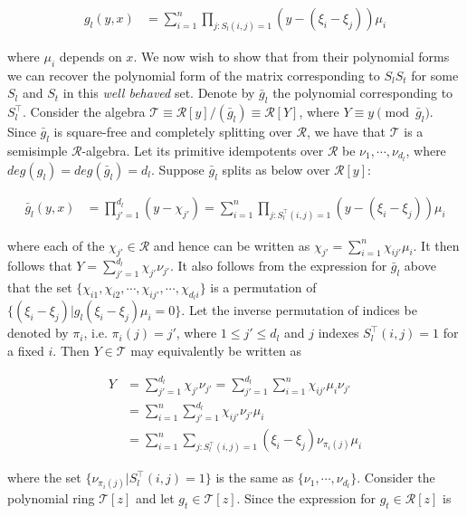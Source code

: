 	\begin{align*}
		g_l(y,x) &= \sum_{i=1}^n \prod_{j:S_l(i,j)=1} (y-(\xi_i-\xi_j)) \mu_i
	\end{align*}


        where $\mu_i$ depends on $x$. We now wish to show that from their polynomial forms we can recover the polynomial form of the matrix corresponding to $S_lS_t$ for some $S_l$ and $S_t$ in this \emph{well behaved} set. 
	Denote by $\bar{g}_l$ the 
	polynomial corresponding to $S_l^\top$. Consider the algebra $\mathcal{T} \equiv \mathcal{R}[y]/(\bar{g}_l) \equiv \mathcal{R}[Y]$, where $Y \equiv y \pmod{\bar{g}_l}$. Since $\bar{g}_l$ is square-free and completely
	splitting over $\mathcal{R}$, we have that $\mathcal{T}$ is a semisimple $\mathcal{R}$-algebra. Let its primitive idempotents over $\mathcal{R}$ be $\nu_1,\cdots,\nu_{d_l}$, where $deg(g_l)=deg(\bar{g}_l)=d_l$. Suppose
	$\bar{g}_l$ splits as below over $\mathcal{R}[y]$:
	
	\begin{align*}
		\bar{g}_l(y,x) &= \prod_{j'=1}^{d_l} (y-\chi_{j'}) = \sum_{i=1}^n \prod_{j:S_l^\top(i,j)=1} (y-(\xi_i-\xi_j))\mu_i
	\end{align*}


	where each of the $\chi_{j'} \in \mathcal{R}$ and hence can be written as $\chi_{j'}=\sum_{i=1}^n \chi_{ij'} \mu_i$. It then follows that $Y = \sum_{j'=1}^{d_l} \chi_{j'}\nu_{j'}$. It also follows from the expression 
	for $\bar{g}_l$ above that the set $\{\chi_{i1},\chi_{i2},\cdots,\chi_{ij'},\cdots,\chi_{d_li}\}$ is a permutation of $\{(\xi_i-\xi_j)|g_l(\xi_i-\xi_j)\mu_i=0\}$. Let the inverse permutation of indices be denoted by 
	$\pi_i$, i.e. $\pi_i(j)=j'$, where $1 \le j' \le d_l$ and $j$ indexes $S_l^\top(i,j)=1$ for a fixed $i$. Then $Y \in \mathcal{T}$ may equivalently be written as 

	\begin{align*}
		Y &= \sum_{j'=1}^{d_l}\chi_{j'}\nu_{j'} = \sum_{j'=1}^{d_l}\sum_{i=1}^n \chi_{ij'}\mu_i \nu_{j'}\\
		  &= \sum_{i=1}^n \sum_{j'=1}^{d_l} \chi_{ij'} \nu_{j'}\mu_i \\
		  &= \sum_{i=1}^n \sum_{j:S_l^\top(i,j)=1} (\xi_i-\xi_j) \nu_{\pi_i(j)} \mu_i 
	\end{align*}

	where the set $\{\nu_{\pi_i(j)}|S_l^\top(i,j)=1\}$ is the same as  $\{\nu_1,\cdots,\nu_{d_l}\}$. Consider the polynomial ring $\mathcal{T}[z]$ and let $g_t \in \mathcal{T}[z]$. Since the expression for $g_t \in 
	\mathcal{R}[z]$ is

